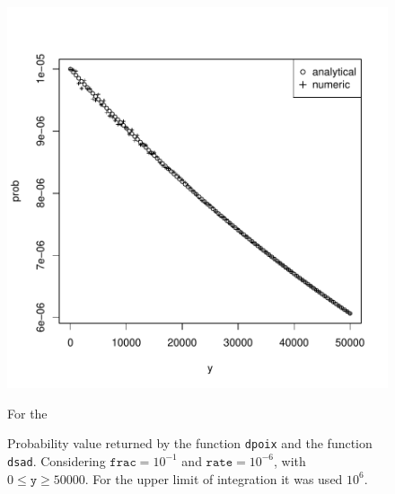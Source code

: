 \documentclass{article}
\newcommand{\code}[1]{\texttt{#1}}
\begin{document}
\begin{figure}[ht]
  \begin{center}
\includegraphics{sads_logbook-016}
\end{center}
\caption{Probability value returned by the function \code{dpoix} and the function \code{dsad}. Considering $\code{frac}=10^{-1}$ and $\code{rate}=10^{-6}$, with $0 \leq \code{y} \geq 50000$. For the upper limit of integration it was used $10^{6}$.}
\label{fig:GLIntegrate} For the 
\end{figure}
\end{document}
